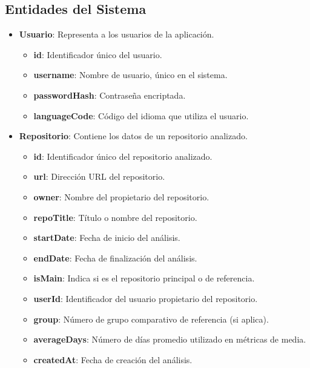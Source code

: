 \subsection{Entidades del Sistema}
\begin{itemize}
	\item \textbf{Usuario}: Representa a los usuarios de la aplicación.
		\begin{itemize}
			\item \textbf{id}: Identificador único del usuario.
			\item \textbf{username}: Nombre de usuario, único en el sistema.
			\item \textbf{passwordHash}: Contraseña encriptada.
			\item \textbf{languageCode}: Código del idioma que utiliza el usuario.
		\end{itemize}

	\item \textbf{Repositorio}: Contiene los datos de un repositorio analizado.
		\begin{itemize}
			\item \textbf{id}: Identificador único del repositorio analizado.
			\item \textbf{url}: Dirección URL del repositorio.
			\item \textbf{owner}: Nombre del propietario del repositorio.
			\item \textbf{repoTitle}: Título o nombre del repositorio.
			\item \textbf{startDate}: Fecha de inicio del análisis.
			\item \textbf{endDate}: Fecha de finalización del análisis.
			\item \textbf{isMain}: Indica si es el repositorio principal o de referencia.
			\item \textbf{userId}: Identificador del usuario propietario del repositorio.
			\item \textbf{group}: Número de grupo comparativo de referencia (si aplica).
			\item \textbf{averageDays}: Número de días promedio utilizado en métricas de media.
			\item \textbf{createdAt}: Fecha de creación del análisis.
		\end{itemize}


\end{itemize}
